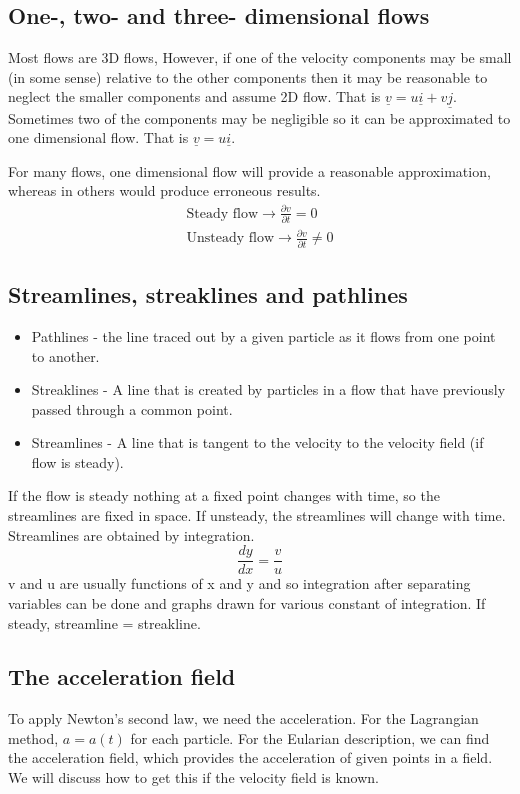 \documentclass[class=report, crop=false, 12pt,a4paper]{standalone}
\begin{document}
\subsection{One-, two- and three- dimensional flows}
Most flows are 3D flows, However, if one of the velocity components may be small (in some sense) relative to the other components then it may be reasonable to neglect the smaller components and assume 2D flow. That is \( \underline{v} = u\underline{i} + v\underline{j} \). Sometimes two of the components may be negligible so it can be approximated to one dimensional flow. That is \( \underline{v} = u\underline{i} \).

For many flows, one dimensional flow will provide a reasonable approximation, whereas in others would produce erroneous results.
\begin{gather} 
  \textrm{Steady flow} \rightarrow \frac{\partial v}{\partial t} = 0\\
  \textrm{Unsteady flow} \rightarrow \frac{\partial v}{\partial t} \neq 0 
\end{gather}
\subsection{Streamlines, streaklines and pathlines}
\begin{itemize}[noitemsep]
  \item Pathlines - the line traced out by a given particle as it flows from one point to another.
  \item Streaklines - A line that is created by particles in a flow that have previously passed through a common point.
  \item Streamlines - A line that is tangent to the velocity to the velocity field (if flow is steady).
\end{itemize}
If the flow is steady nothing at a fixed point changes with time, so the streamlines are fixed in space. If unsteady, the streamlines will change with time. Streamlines are obtained by integration. 
\begin{equation} 
  \frac{dy}{dx} = \frac{v}{u} 
\end{equation}
v and u are usually functions of x and y and so integration after separating variables can be done and graphs drawn for various constant of integration. If steady, streamline = streakline.
\subsection{The acceleration field}
To apply Newton's second law, we need the acceleration. For the Lagrangian method, \( a = a(t) \) for each particle. For the Eularian description, we can find the acceleration field, which provides the acceleration of given points in a field. We will discuss how to get this if the velocity field is known. 
\end{document}
